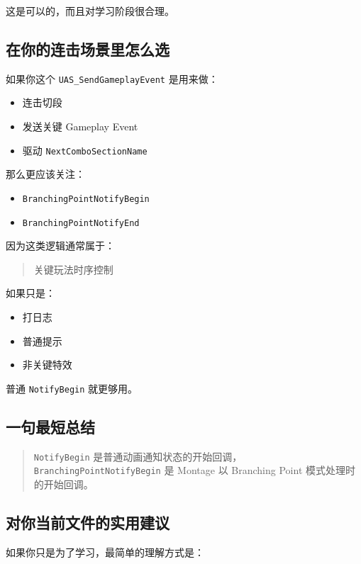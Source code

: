 这是可以的，而且对学习阶段很合理。

\subsection{在你的连击场景里怎么选}

如果你这个 \verb|UAS_SendGameplayEvent| 是用来做：

\begin{itemize}
	\item 连击切段
	\item 发送关键 Gameplay Event
	\item 驱动 \verb|NextComboSectionName|
\end{itemize}

那么更应该关注：

\begin{itemize}
	\item \verb|BranchingPointNotifyBegin|
	\item \verb|BranchingPointNotifyEnd|
\end{itemize}

因为这类逻辑通常属于：

\begin{quote}
	关键玩法时序控制
\end{quote}

如果只是：

\begin{itemize}
	\item 打日志
	\item 普通提示
	\item 非关键特效
\end{itemize}

普通 \verb|NotifyBegin| 就更够用。

\subsection{一句最短总结}

\begin{quote}
	\verb|NotifyBegin| 是普通动画通知状态的开始回调，\\
	\verb|BranchingPointNotifyBegin| 是 Montage 以 Branching Point 模式处理时的开始回调。
\end{quote}

\subsection{对你当前文件的实用建议}

如果你只是为了学习，最简单的理解方式是：

